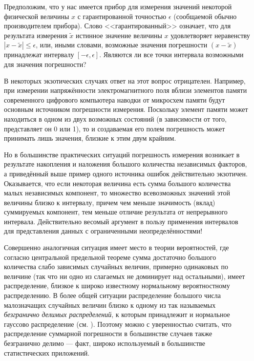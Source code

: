 \documentclass[a5paper,openany]{book}
\begin{document}
Предположим, что у нас имеется прибор для измерения значений некоторой физической 
величины $x$ с гарантированной точностью $\epsilon$ (сообщаемой обычно производителем 
прибора). Слово <<гарантированный>> означает, что для результата измерения $\tilde{x}$ 
истинное значение величины $x$ удовлетворяет неравенству $|x-\tilde{x}|\leq\epsilon$, 
или, иными словами, возможные значения погрешности $(x-\tilde{x})$ принадлежат 
интервалу $[-\epsilon, \epsilon]$. Являются ли все точки интервала возможными 
для значения погрешности? 
  
В некоторых экзотических случаях ответ на этот вопрос отрицателен. Например, при 
измерении напряжённости электромагнитного поля вблизи элементов памяти современного 
цифрового компьютера наводки от микросхем памяти будут основным источником погрешности 
измерения. Поскольку элемент памяти может находиться в одном из двух возможных 
состояний (в зависимости от того, представляет он 0 или 1), то и создаваемая его 
полем погрешность может принимать лишь значения, близкие к этим двум крайним. 
  
Но в большинстве практических ситуаций погрешность измерения возникает в результате 
накопления и наложения большого количества независимых факторов, а приведённый выше 
пример одного источника ошибок действительно экзотичен. Оказывается, что если некоторая 
величина есть сумма большого количества малых независимых компонент, то множество 
всевозможных значений этой величины близко к интервалу, причем чем меньше значимость 
(вклад) суммируемых компонент, тем меньше отличие результата от непрерывного интервала. 
Действительно весомый аргумент в пользу применения интервалов для представления данных 
с ограниченными неопределённостями! 
  
Совершенно аналогичная ситуация имеет место в теории вероятностей, где согласно 
центральной предельной теореме сумма достаточно большого количества слабо зависимых 
случайных величин, примерно одинаковых по величине (так что ни одно из слагаемых 
не доминирует над остальными), имеет распределение, близкое к широко известному 
нормальному вероятностному распределению. В более общей ситуации распределение 
большого числа малозначащих случайных величин близко к одному из так называемых 
\emph{безгранично делимых распределений}, к которым принадлежит и нормальное 
гауссово распределение (см. \cite{Gnedenko}). Поэтому можно с уверенностью считать, 
что распределение суммарной погрешности в большинстве случаев также безгранично 
делимо --- факт, широко используемый в большинстве статистических приложений. 
  
\end{document}
